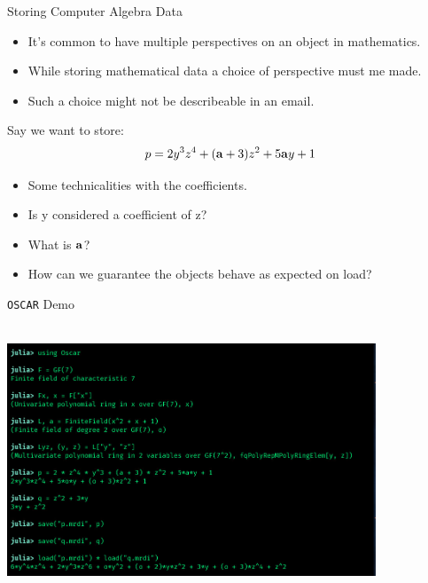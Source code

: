 \documentclass[9pt]{beamer}
\newcommand\oscar{\texttt{OSCAR}\xspace}
\theoremstyle{definition}
\begin{document}


\begin{frame}[fragile]{Storing Computer Algebra Data}
  \begin{itemize}
    \item It's common to have multiple perspectives on an object in mathematics. 
    \item While storing mathematical data a choice of perspective must me made.
    \item Such a choice might not be describeable in an email.
    \end{itemize}

  Say we want to store:
  \begin{align*}
    p = 2y^3z^4 + (\bold{a} + 3)z^2 + 5\bold{a}y + 1
  \end{align*} \pause

  \begin{itemize}
  \item Some technicalities with the coefficients.
  \item Is y considered a coefficient of z?
  \item What is $\bold{a}$?
  \item How can we guarantee the objects behave as expected on load?
  \end{itemize}
\end{frame}


\begin{frame}[fragile]{\oscar Demo}
  \begin{center}
    \includegraphics[height=8cm, width=11cm]{images/demo}
  \end{center}
\end{frame}
\end{document}
